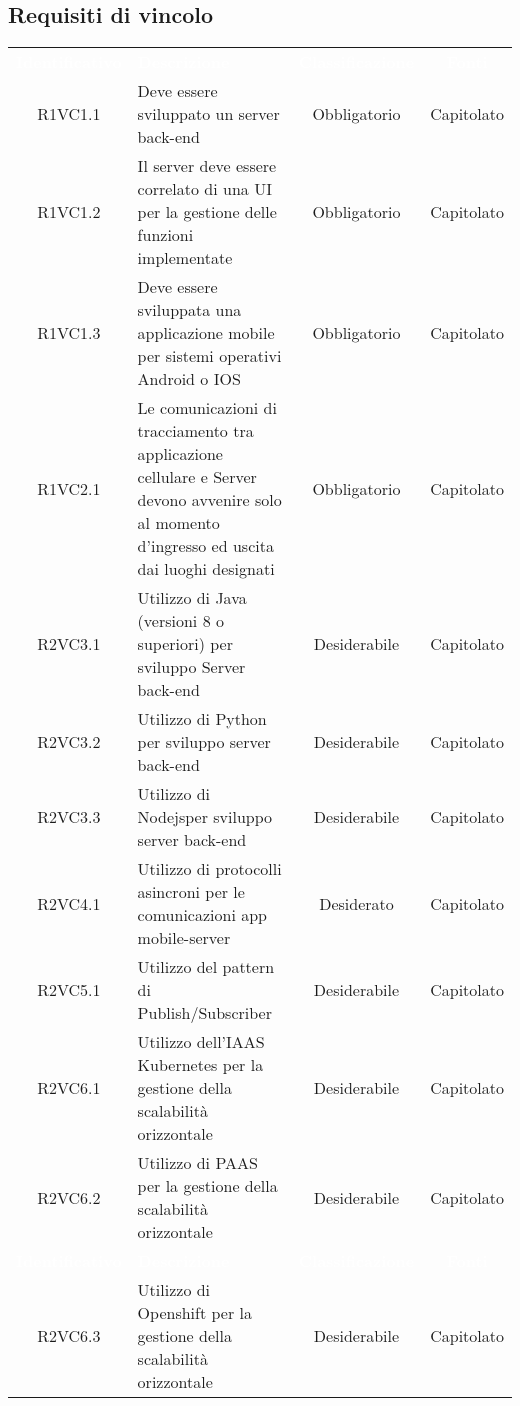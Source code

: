 \renewcommand{\o}{Obbligatorio}
\renewcommand{\d}{Desiderabile}

\subsection{Requisiti di vincolo}
{
\renewcommand{\arraystretch}{2}
\centering
\begin{longtable}{ c C{8cm} c c}
\textcolor{white}{\textbf{Identificativo}} & \textcolor{white}{\textbf{Descrizione}} & \textcolor{white}{\textbf{Classificazione}} & \textcolor{white}{\textbf{Fonti}}\\	

R1VC1.1 & Deve essere sviluppato un server back-end & \o & Capitolato \\
R1VC1.2 & Il server deve essere correlato di una UI per la gestione delle funzioni implementate& \o & Capitolato \\
R1VC1.3 & Deve essere sviluppata una applicazione mobile per sistemi operativi Android o IOS & \o & Capitolato \\
R1VC2.1 & Le comunicazioni di tracciamento tra applicazione cellulare e Server devono avvenire solo al momento d’ingresso ed uscita dai luoghi designati & \o & Capitolato \\
R2VC3.1 & Utilizzo di Java (versioni 8 o superiori) per sviluppo Server back-end & \d & Capitolato \\
R2VC3.2 & Utilizzo di Python per sviluppo server back-end & \d & Capitolato \\
R2VC3.3 & Utilizzo di Nodejsper sviluppo server back-end & \d & Capitolato \\
R2VC4.1 & Utilizzo di protocolli asincroni per le comunicazioni app mobile-server & Desiderato & Capitolato \\
R2VC5.1 & Utilizzo del pattern di Publish/Subscriber & \d & Capitolato \\
R2VC6.1 & Utilizzo dell’IAAS Kubernetes per la gestione della scalabilità orizzontale& \d & Capitolato \\
R2VC6.2 & Utilizzo di PAAS per la gestione della scalabilità orizzontale& \d & Capitolato \\
\textcolor{white}{\textbf{Identificativo}} & \textcolor{white}{\textbf{Descrizione}} & \textcolor{white}{\textbf{Classificazione}} & \textcolor{white}{\textbf{Fonti}}\\	
R2VC6.3 & Utilizzo di Openshift per la gestione della scalabilità orizzontale& \d & Capitolato \\

\end{longtable}}

